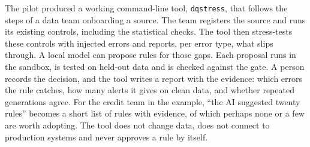 \documentclass[11pt,a4paper]{article}
\begin{document}
The pilot produced a working command-line tool, \texttt{dqstress}, that follows the steps of a data team onboarding a source. The team registers the source and runs its existing controls, including the statistical checks. The tool then stress-tests these controls with injected errors and reports, per error type, what slips through. A local model can propose rules for those gaps. Each proposal runs in the sandbox, is tested on held-out data and is checked against the gate. A person records the decision, and the tool writes a report with the evidence: which errors the rule catches, how many alerts it gives on clean data, and whether repeated generations agree. For the credit team in the example, ``the AI suggested twenty rules'' becomes a short list of rules with evidence, of which perhaps none or a few are worth adopting. The tool does not change data, does not connect to production systems and never approves a rule by itself.
\end{document}
